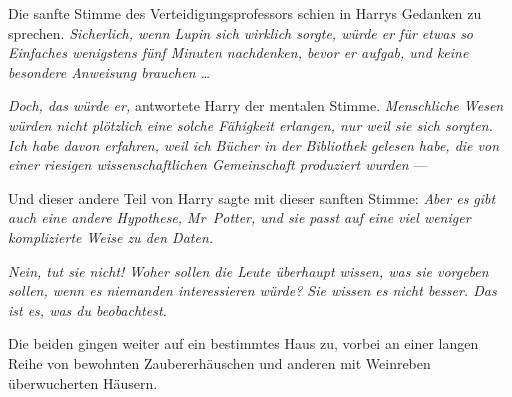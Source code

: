 Die sanfte Stimme des Verteidigungsprofessors schien in Harrys Gedanken zu sprechen.
\emph{Sicherlich, wenn Lupin sich wirklich sorgte, würde er für etwas so Einfaches wenigstens fünf Minuten nachdenken, bevor er aufgab, und keine besondere Anweisung brauchen …}

\emph{Doch, das würde er,} antwortete Harry der mentalen Stimme. \emph{Menschliche Wesen würden nicht plötzlich eine solche Fähigkeit erlangen, nur weil sie sich sorgten. Ich habe davon erfahren, weil ich Bücher in der Bibliothek gelesen habe, die von einer riesigen wissenschaftlichen Gemeinschaft produziert wurden} —

Und dieser andere Teil von Harry sagte mit dieser sanften Stimme: \emph{Aber es gibt auch eine andere Hypothese, Mr~Potter, und sie passt auf eine viel weniger komplizierte Weise zu den Daten.}


\emph{Nein, tut sie nicht! Woher sollen die Leute überhaupt wissen, was sie vorgeben sollen, wenn es niemanden interessieren würde? Sie wissen es nicht besser. Das ist es, was du beobachtest.}

Die beiden gingen weiter auf ein bestimmtes Haus zu, vorbei an einer langen Reihe von bewohnten Zaubererhäuschen und anderen mit Weinreben überwucherten Häusern.

